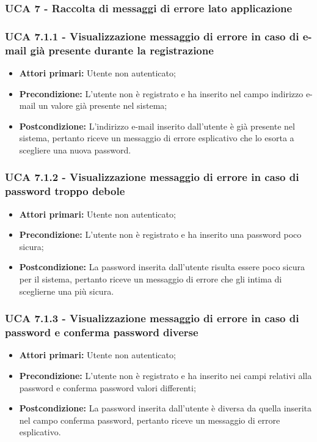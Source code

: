 \newpage
\subsubsection{UCA 7 - Raccolta di messaggi di errore lato applicazione}
\subsubsection{UCA 7.1.1 - Visualizzazione messaggio di errore in caso di e-mail già presente durante la registrazione}%
\begin{itemize}
\item \textbf{Attori primari:} Utente non autenticato;
\item \textbf{Precondizione:} L'utente non è registrato e ha inserito nel campo indirizzo e-mail un valore già presente nel sistema;
\item \textbf{Postcondizione:} L'indirizzo e-mail inserito dall'utente è già presente nel sistema, pertanto riceve un messaggio di errore esplicativo che lo esorta a scegliere una nuova password.
\end{itemize}

\subsubsection{UCA 7.1.2 - Visualizzazione messaggio di errore in caso di password troppo debole}%
\begin{itemize}
\item \textbf{Attori primari:} Utente non autenticato;
\item \textbf{Precondizione:} L'utente non è registrato e ha inserito una password poco sicura;
\item \textbf{Postcondizione:} La password inserita dall'utente risulta essere poco sicura per il sistema, pertanto riceve un messaggio di errore che gli intima di sceglierne una più sicura.
\end{itemize}


\subsubsection{UCA 7.1.3 - Visualizzazione messaggio di errore in caso di password e conferma password diverse}%
\begin{itemize}
\item \textbf{Attori primari:} Utente non autenticato;
\item \textbf{Precondizione:} L'utente non è registrato e ha inserito nei campi relativi alla password e conferma password valori differenti;
\item \textbf{Postcondizione:} La password inserita dall'utente è diversa da quella inserita nel campo conferma password, pertanto riceve un messaggio di errore esplicativo.
\end{itemize}

